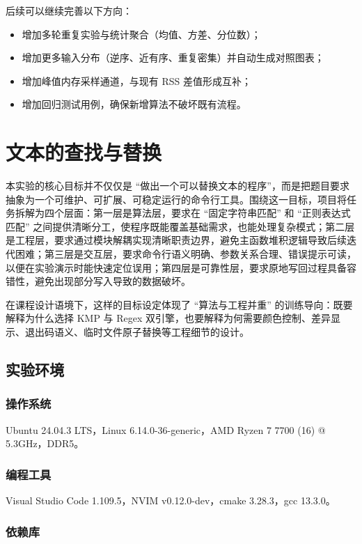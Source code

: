 \documentclass[12pt, a4paper]{ctexart}
\begin{document}
后续可以继续完善以下方向：

\begin{itemize}
    \item 增加多轮重复实验与统计聚合（均值、方差、分位数）；
    \item 增加更多输入分布（逆序、近有序、重复密集）并自动生成对照图表；
    \item 增加峰值内存采样通道，与现有 RSS 差值形成互补；
    \item 增加回归测试用例，确保新增算法不破坏既有流程。
\end{itemize}

\section{文本的查找与替换}

本实验的核心目标并不仅仅是 ``做出一个可以替换文本的程序''，而是把题目要求抽象为一个可维护、可扩展、可稳定运行的命令行工具。围绕这一目标，项目将任务拆解为四个层面：第一层是算法层，要求在 ``固定字符串匹配'' 和 ``正则表达式匹配'' 之间提供清晰分工，使程序既能覆盖基础需求，也能处理复杂模式；第二层是工程层，要求通过模块解耦实现清晰职责边界，避免主函数堆积逻辑导致后续迭代困难；第三层是交互层，要求命令行语义明确、参数关系合理、错误提示可读，以便在实验演示时能快速定位误用；第四层是可靠性层，要求原地写回过程具备容错性，避免出现部分写入导致的数据破坏。

在课程设计语境下，这样的目标设定体现了 ``算法与工程并重'' 的训练导向：既要解释为什么选择 KMP 与 Regex 双引擎，也要解释为何需要颜色控制、差异显示、退出码语义、临时文件原子替换等工程细节的设计。

\subsection{实验环境}

\subsubsection{操作系统}

Ubuntu 24.04.3 LTS，Linux 6.14.0-36-generic，AMD Ryzen 7 7700 (16) @ 5.3GHz，DDR5。

\subsubsection{编程工具}

Visual Studio Code 1.109.5，NVIM v0.12.0-dev，cmake 3.28.3，gcc 13.3.0。

\subsubsection{依赖库}
\end{document}
